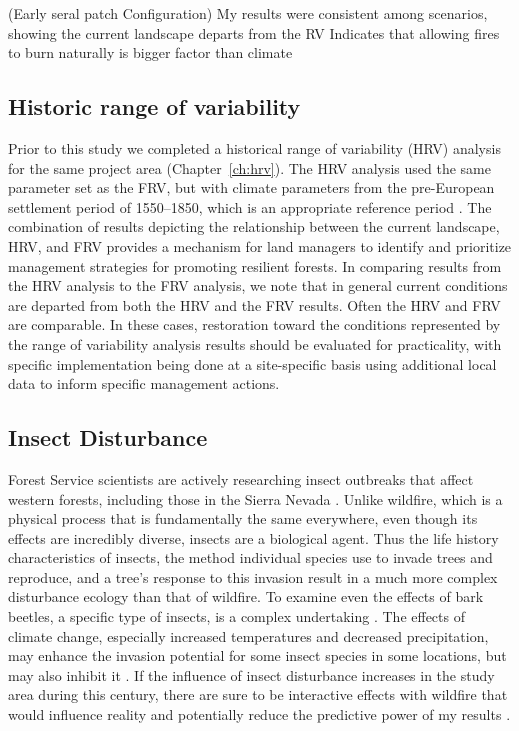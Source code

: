 (Early seral patch Configuration) 
My results were consistent among scenarios, showing the current landscape departs from the RV
Indicates that allowing fires to burn naturally is bigger factor than climate



\subsection{Historic range of variability}
Prior to this study we completed a historical range of variability (HRV) analysis for the same project area (Chapter~\ref{ch:hrv}). The HRV analysis used the same parameter set as the FRV, but with climate parameters from the pre-European settlement period of 1550--1850, which is an appropriate reference period \citep{Safford2013}. The combination of results depicting the relationship between the current landscape, HRV, and FRV provides a mechanism for land managers to identify and prioritize management strategies for promoting resilient forests. In comparing results from the HRV analysis to the FRV analysis, we note that in general current conditions are departed from both the HRV and the FRV results. Often the HRV and FRV are comparable. In these cases, restoration toward the conditions represented by the range of variability analysis results should be evaluated for practicality, with specific implementation being done at a site-specific basis using additional local data to inform specific management actions.

\subsection{Insect Disturbance}
Forest Service scientists are actively researching insect outbreaks that affect western forests, including those in the Sierra Nevada \citep{Liebhold2011}. Unlike wildfire, which is a physical process that is fundamentally the same everywhere, even though its effects are incredibly diverse, insects are a biological agent. Thus the life history characteristics of insects, the method individual species use to invade trees and reproduce, and a tree's response to this invasion result in a much more complex disturbance ecology than that of wildfire. To examine even the effects of bark beetles, a specific type of insects, is a complex undertaking \citep{Fettig2007}. The effects of climate change, especially increased temperatures and decreased precipitation, may enhance the invasion potential for some insect species in some locations, but may also inhibit it \citep{Logan2003,Bentz2010}. If the influence of insect disturbance increases in the study area during this century, there are sure to be interactive effects with wildfire that would influence reality and potentially reduce the predictive power of my results \citep{Ferrell1996}.

